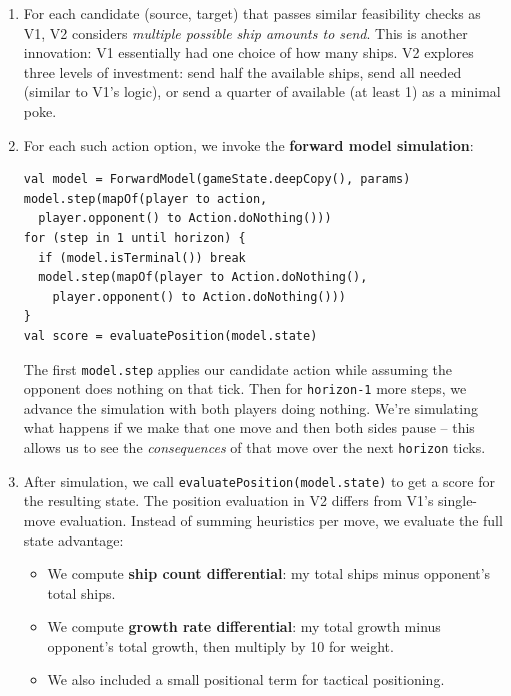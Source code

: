 \documentclass[conference]{IEEEtran}
\begin{document}
\begin{enumerate}
\item For each candidate (source, target) that passes similar feasibility checks as V1, V2 considers \textit{multiple possible ship amounts to send}. This is another innovation: V1 essentially had one choice of how many ships. V2 explores three levels of investment: send half the available ships, send all needed (similar to V1's logic), or send a quarter of available (at least 1) as a minimal poke.

\item For each such action option, we invoke the \textbf{forward model simulation}:

\begin{scriptsize}
\raggedright
\begin{verbatim}
val model = ForwardModel(gameState.deepCopy(), params)
model.step(mapOf(player to action, 
  player.opponent() to Action.doNothing()))
for (step in 1 until horizon) {
  if (model.isTerminal()) break
  model.step(mapOf(player to Action.doNothing(), 
    player.opponent() to Action.doNothing()))
}
val score = evaluatePosition(model.state)
\end{verbatim}
\end{scriptsize}

The first \texttt{model.step} applies our candidate action while assuming the opponent does nothing on that tick. Then for \texttt{horizon-1} more steps, we advance the simulation with both players doing nothing. We're simulating what happens if we make that one move and then both sides pause -- this allows us to see the \textit{consequences} of that move over the next \texttt{horizon} ticks.

\item After simulation, we call \texttt{evaluatePosition\linebreak(model.state)} to get a score for the resulting state. The position evaluation in V2 differs from V1's single-move evaluation. Instead of summing heuristics per move, we evaluate the full state advantage:

\begin{itemize}
\item We compute \textbf{ship count differential}: my total ships minus opponent's total ships.
\item We compute \textbf{growth rate differential}: my total growth minus opponent's total growth, then multiply by 10 for weight.
\item We also included a small positional term for tactical positioning.
\end{itemize}


\end{enumerate}
\end{document}
